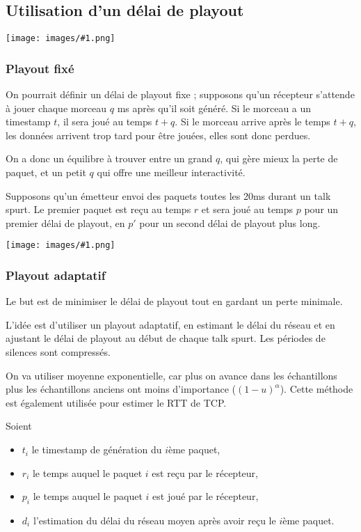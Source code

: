 \documentclass[10pt,a4paper]{report}
\newcommand{\dessin}[1]{\begin{center}\texttt{[image: images/\#1.png]}\end{center}}
\newcommand{\dessinS}[2]{\begin{center}\texttt{[image: images/\#1.png]}\end{center}}
\begin{document}
	
		\subsection{Utilisation d'un délai de playout}
		
		\dessin{75}
		
			\subsubsection{Playout fixé}
			On pourrait définir un délai de playout fixe ; supposons qu'un récepteur s'attende à jouer chaque morceau $q$ ms après qu'il soit généré. Si le morceau a un timestamp $t$, il sera joué au temps $t + q$. Si le morceau arrive après le temps $t + q$, les données arrivent trop tard pour être jouées, elles sont donc perdues.
		
			On a donc un équilibre à trouver entre un grand $q$, qui gère mieux la perte de paquet, et un petit $q$ qui offre une meilleur interactivité.
		
			Supposons qu'un émetteur envoi des paquets toutes les 20ms durant un talk spurt. Le premier paquet est reçu au temps $r$ et sera joué au temps $p$ pour un premier délai de playout, en $p'$ pour un second délai de playout plus long.
		
			\dessinS{79}{.85}
		
	
			\subsubsection{Playout adaptatif}
			
			Le but est de minimiser le délai de playout tout en gardant un perte minimale.
			
			L'idée est d'utiliser un playout adaptatif, en estimant le délai du réseau et en ajustant le délai de playout au début de chaque talk spurt. Les périodes de silences sont compressés.
			
			On va utiliser moyenne exponentielle, car plus on avance dans les échantillons plus les échantillons anciens ont moins d'importance ($(1 - u)^\alpha$). Cette méthode est également utilisée pour estimer le RTT de TCP.
			
			Soient
			
			\begin{itemize}
				\item $t_i$ le timestamp de génération du $i$ème paquet,
				\item $r_i$ le temps auquel le paquet $i$ est reçu par le récepteur,
				\item $p_i$ le temps auquel le paquet $i$ est joué par le récepteur,
				\item $d_i$ l'estimation du délai du réseau moyen après avoir reçu le $i$ème paquet.
			\end{itemize}
			
\end{document}

